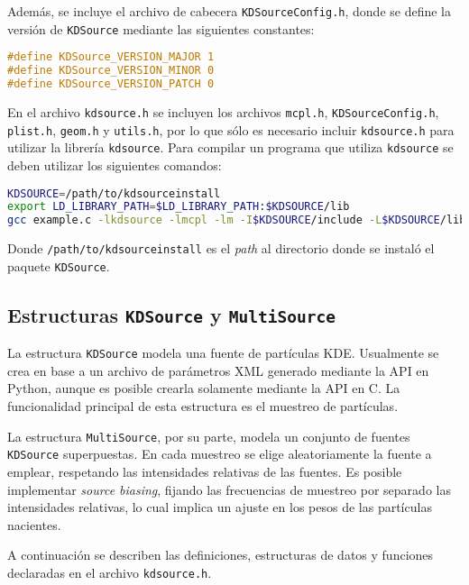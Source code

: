 Además, se incluye el archivo de cabecera \verb|KDSourceConfig.h|, donde se define la versión de \verb|KDSource| mediante las siguientes constantes:
\begin{lstlisting}[language=C]
#define KDSource_VERSION_MAJOR 1
#define KDSource_VERSION_MINOR 0
#define KDSource_VERSION_PATCH 0
\end{lstlisting}

En el archivo \verb|kdsource.h| se incluyen los archivos \verb|mcpl.h|, \verb|KDSourceConfig.h|, \verb|plist.h|, \verb|geom.h| y \verb|utils.h|, por lo que sólo es necesario incluir \verb|kdsource.h| para utilizar la librería \verb|kdsource|. Para compilar un programa que utiliza \verb|kdsource| se deben utilizar los siguientes comandos:
\begin{lstlisting}[language=bash]
KDSOURCE=/path/to/kdsourceinstall
export LD_LIBRARY_PATH=$LD_LIBRARY_PATH:$KDSOURCE/lib
gcc example.c -lkdsource -lmcpl -lm -I$KDSOURCE/include -L$KDSOURCE/lib
\end{lstlisting}
Donde \verb|/path/to/kdsourceinstall| es el \emph{path} al directorio donde se instaló el paquete \verb|KDSource|.


\subsection{Estructuras \texttt{KDSource} y \texttt{MultiSource}}

La estructura \verb|KDSource| modela una fuente de partículas KDE. Usualmente se crea en base a un archivo de parámetros XML generado mediante la API en Python, aunque es posible crearla solamente mediante la API en C. La funcionalidad principal de esta estructura es el muestreo de partículas.

La estructura \verb|MultiSource|, por su parte, modela un conjunto de fuentes \verb|KDSource| superpuestas. En cada muestreo se elige aleatoriamente la fuente a emplear, respetando las intensidades relativas de las fuentes. Es posible implementar \emph{source biasing}, fijando las frecuencias de muestreo por separado las intensidades relativas, lo cual implica un ajuste en los pesos de las partículas nacientes.

A continuación se describen las definiciones, estructuras de datos y funciones declaradas en el archivo \verb|kdsource.h|.

